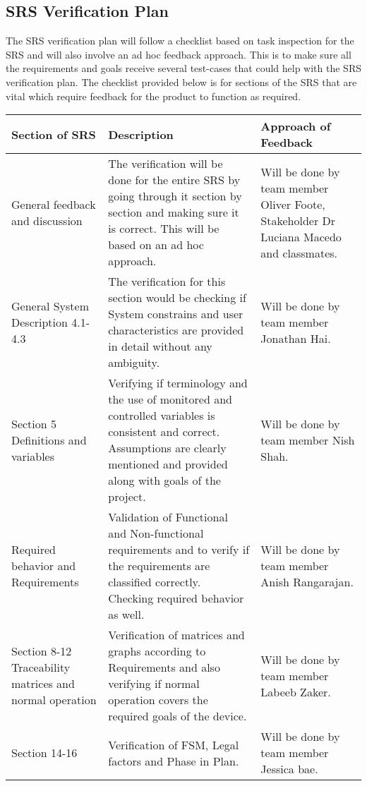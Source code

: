 \documentclass[12pt, titlepage]{article}
\begin{document}
\subsection{SRS Verification Plan}

The SRS verification plan will follow a checklist based on task inspection for the SRS and will also involve an ad hoc feedback approach. This is to make sure all the requirements and goals receive several test-cases that could help with the SRS verification plan. The checklist provided below is for sections of the SRS that are vital which require feedback for the product to function as required.


\begin{center}
\begin{tabular}{|p{3cm}|p{8cm}|p{4cm}|} 

  \hline
  \textbf{Section of SRS}     & \textbf{Description}           & \textbf{Approach of Feedback}                                                                                                                                                                       
  \\
  \hline
  General feedback and discussion & The verification will be done for the entire SRS by going through it section by section and making sure it is correct. This will be based on an ad hoc approach.               & Will be done by team member Oliver Foote, Stakeholder Dr Luciana Macedo and classmates. \\
  \hline
  General System Description 4.1-4.3  & The verification for this section would be checking if System constrains and user characteristics are provided in detail without any ambiguity.                & Will be done by team member Jonathan Hai.                                                                                                             \\
  \hline
  Section 5 Definitions and variables     & Verifying if terminology and the use of monitored and controlled variables is consistent and correct. Assumptions are clearly mentioned and provided along with goals of the project.        & Will be done by team member  Nish Shah.\\
  \hline
  Required behavior and Requirements       & Validation of Functional and Non-functional requirements and to verify if the requirements are classified correctly. Checking required behavior as well.       & Will be done by team member Anish Rangarajan.                                                                                         \\
  \hline
  Section 8-12 Traceability matrices and normal operation      & Verification of matrices and graphs according to Requirements and also verifying if normal operation covers the required goals of the device. & Will be done by team member Labeeb Zaker.\\
  \hline
  Section 14-16        & Verification of FSM, Legal factors and Phase in Plan.       & Will be done by team member Jessica bae.                                                          \\
  \hline
\end{tabular}
  \end{center}
\end{document}
